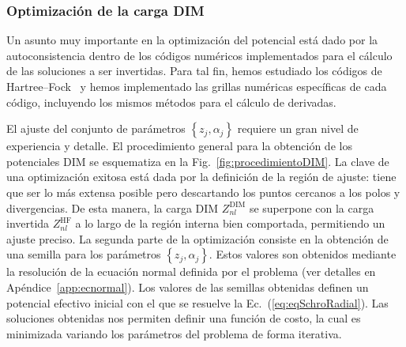 \subsubsection{Optimización de la carga DIM}
\label{subsec:optDIM}

Un asunto muy importante en la optimización del potencial está dado por 
la autoconsistencia dentro de los códigos numéricos implementados para 
el cálculo de las soluciones a ser invertidas. Para tal fin, hemos 
estudiado los códigos de Hartree--Fock~\cite{FroeseFischer:97,
Johnson:07} y hemos implementado las grillas numéricas específicas de 
cada código, incluyendo los mismos métodos para el cálculo de derivadas. 

El ajuste del conjunto de parámetros $\left\{z_j,\alpha_j\right\}$ 
requiere un gran nivel de experiencia y detalle. El procedimiento 
general para la obtención de los potenciales DIM se esquematiza en la 
Fig.~\ref{fig:procedimientoDIM}. La clave de una optimización exitosa 
está dada por la definición de la región de ajuste: tiene que ser lo más 
extensa posible pero descartando los puntos cercanos a los polos y 
divergencias. De esta manera, la carga DIM $Z_{nl}^{\mathrm{DIM}}$ se 
superpone con la carga invertida $Z_{nl}^{\mathrm{HF}}$ a lo largo de la 
región interna bien comportada, permitiendo un ajuste preciso. La 
segunda parte de la optimización consiste en la obtención de una semilla 
para los parámetros $\left\{z_j,\alpha_j\right\}$. Estos valores son 
obtenidos mediante la resolución de la ecuación normal definida por el 
problema (ver detalles en Apéndice~\ref{app:ecnormal}). Los valores de 
las semillas obtenidas definen un potencial efectivo inicial con el que 
se resuelve la Ec.~(\ref{eq:eqSchroRadial}). Las soluciones obtenidas 
nos permiten definir una función de costo, la cual es minimizada 
variando los parámetros del problema de forma iterativa. 

